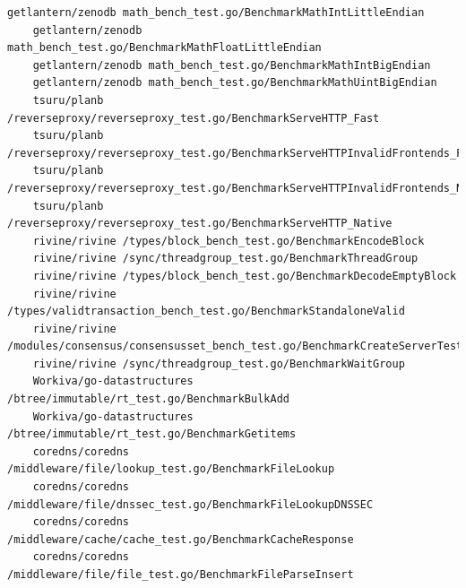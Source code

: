 \documentclass{seal_thesis}
\begin{document}
\begin{lstlisting}[basicstyle=\tiny]
	getlantern/zenodb math_bench_test.go/BenchmarkMathIntLittleEndian
	getlantern/zenodb math_bench_test.go/BenchmarkMathFloatLittleEndian
	getlantern/zenodb math_bench_test.go/BenchmarkMathIntBigEndian
	getlantern/zenodb math_bench_test.go/BenchmarkMathUintBigEndian
	tsuru/planb /reverseproxy/reverseproxy_test.go/BenchmarkServeHTTP_Fast
	tsuru/planb /reverseproxy/reverseproxy_test.go/BenchmarkServeHTTPInvalidFrontends_Fast
	tsuru/planb /reverseproxy/reverseproxy_test.go/BenchmarkServeHTTPInvalidFrontends_Native
	tsuru/planb /reverseproxy/reverseproxy_test.go/BenchmarkServeHTTP_Native
	rivine/rivine /types/block_bench_test.go/BenchmarkEncodeBlock
	rivine/rivine /sync/threadgroup_test.go/BenchmarkThreadGroup
	rivine/rivine /types/block_bench_test.go/BenchmarkDecodeEmptyBlock
	rivine/rivine /types/validtransaction_bench_test.go/BenchmarkStandaloneValid
	rivine/rivine /modules/consensus/consensusset_bench_test.go/BenchmarkCreateServerTester
	rivine/rivine /sync/threadgroup_test.go/BenchmarkWaitGroup
	Workiva/go-datastructures /btree/immutable/rt_test.go/BenchmarkBulkAdd
	Workiva/go-datastructures /btree/immutable/rt_test.go/BenchmarkGetitems
	coredns/coredns /middleware/file/lookup_test.go/BenchmarkFileLookup
	coredns/coredns /middleware/file/dnssec_test.go/BenchmarkFileLookupDNSSEC
	coredns/coredns /middleware/cache/cache_test.go/BenchmarkCacheResponse
	coredns/coredns /middleware/file/file_test.go/BenchmarkFileParseInsert
\end{lstlisting}
\end{document}
